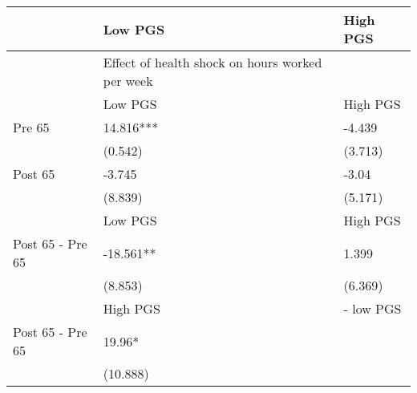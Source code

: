 % 
\begin{tabular}{lll}
  \hline
 & Low PGS & High PGS \\ 
  \hline
 & Effect of health shock on hours worked per week &  \\ 
   & Low PGS & High PGS \\ 
  Pre 65 & 14.816*** & -4.439 \\ 
   & (0.542) & (3.713) \\ 
  Post 65 & -3.745 & -3.04 \\ 
   & (8.839) & (5.171) \\ 
   & Low PGS & High PGS \\ 
  Post 65 - Pre 65 & -18.561** & 1.399 \\ 
   & (8.853) & (6.369) \\ 
   & High PGS  & - low PGS \\ 
  Post 65 - Pre 65 & 19.96* &  \\ 
   & (10.888) &  \\ 
   \hline
\end{tabular}
